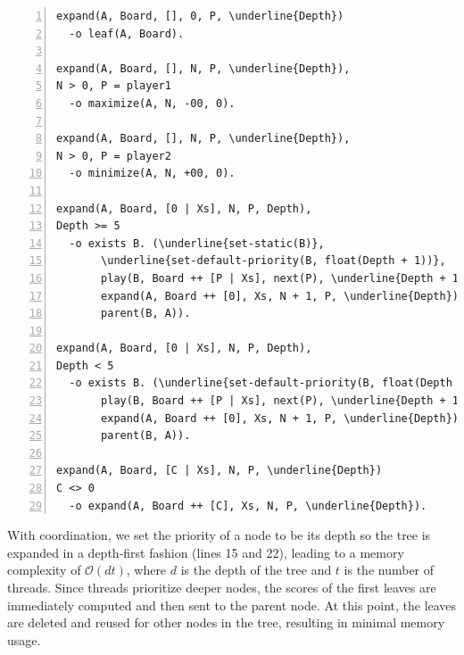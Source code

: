 \begin{topfig}
\scriptsize\begin{Verbatim}[numbers=left,commandchars=\\\{\}]
expand(A, Board, [], 0, P, \underline{Depth})
  -o leaf(A, Board).

expand(A, Board, [], N, P, \underline{Depth}),
N > 0, P = player1
  -o maximize(A, N, -00, 0).

expand(A, Board, [], N, P, \underline{Depth}),
N > 0, P = player2
  -o minimize(A, N, +00, 0).

expand(A, Board, [0 | Xs], N, P, Depth),
Depth >= 5
  -o exists B. (\underline{set-static(B)},
       \underline{set-default-priority(B, float(Depth + 1))},
       play(B, Board ++ [P | Xs], next(P), \underline{Depth + 1}),
       expand(A, Board ++ [0], Xs, N + 1, P, \underline{Depth}),
       parent(B, A)).

expand(A, Board, [0 | Xs], N, P, Depth),
Depth < 5
  -o exists B. (\underline{set-default-priority(B, float(Depth + 1))},
       play(B, Board ++ [P | Xs], next(P), \underline{Depth + 1}),
       expand(A, Board ++ [0], Xs, N + 1, P, \underline{Depth}),
       parent(B, A)).

expand(A, Board, [C | Xs], N, P, \underline{Depth})
C <> 0
  -o expand(A, Board ++ [C], Xs, N, P, \underline{Depth}).
\end{Verbatim}
\vspace*{-2ex}
\end{topfig}
\normalsize

With coordination, we set the priority of a node to be its depth
so the tree is expanded in a depth-first fashion (lines 15 and 22),
leading to a memory complexity of $\mathcal{O}(d t)$, where $d$
is the depth of the tree and $t$ is the number of threads.
Since threads prioritize deeper nodes, the scores of the first leaves are immediately
computed and then sent to the parent node. At this point, the leaves are deleted
and reused for other nodes in the tree, resulting in minimal memory usage.


